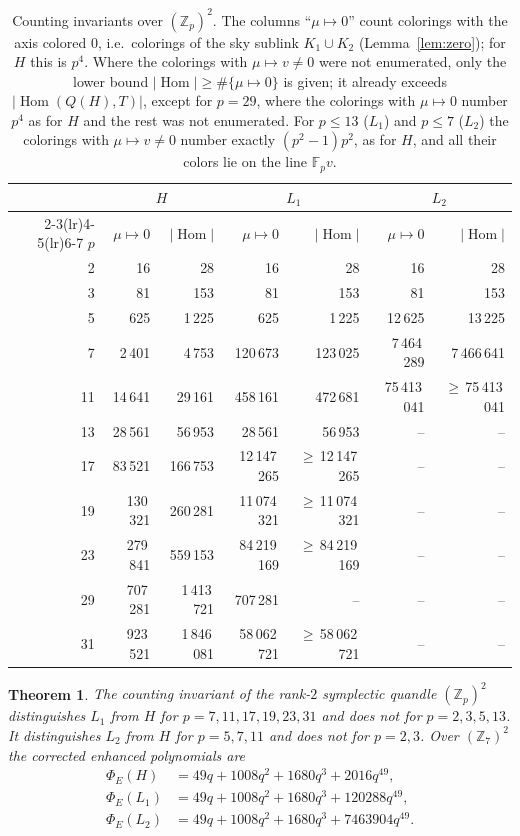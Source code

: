 \documentclass[11pt]{article}
\newtheorem{theorem}{Theorem}[section]
\theoremstyle{definition}
\newcommand{\Z}{\mathbb{Z}}
\newcommand{\F}{\mathbb{F}}
\newcommand{\Hom}{\operatorname{Hom}}
\newcommand{\PhiE}{\Phi_E}
\begin{document}
\begin{table}[h]
\centering\small
\begin{tabular}{@{}rrrrrrr@{}}
\toprule
 & \multicolumn{2}{c}{$H$} & \multicolumn{2}{c}{$L_1$} & \multicolumn{2}{c}{$L_2$}\\
\cmidrule(lr){2-3}\cmidrule(lr){4-5}\cmidrule(lr){6-7}
$p$ & $\mu\mapsto0$ & $|\Hom|$ & $\mu\mapsto0$ & $|\Hom|$ & $\mu\mapsto0$ & $|\Hom|$\\
\midrule
2 & 16 & 28 & 16 & 28 & 16 & 28 \\
3 & 81 & 153 & 81 & 153 & 81 & 153 \\
5 & 625 & 1\,225 & 625 & 1\,225 & 12\,625 & 13\,225 \\
7 & 2\,401 & 4\,753 & 120\,673 & 123\,025 & 7\,464\,289 & 7\,466\,641 \\
11 & 14\,641 & 29\,161 & 458\,161 & 472\,681 & 75\,413\,041 & $\ge$\,75\,413\,041 \\
13 & 28\,561 & 56\,953 & 28\,561 & 56\,953 & -- & -- \\
17 & 83\,521 & 166\,753 & 12\,147\,265 & $\ge$\,12\,147\,265 & -- & -- \\
19 & 130\,321 & 260\,281 & 11\,074\,321 & $\ge$\,11\,074\,321 & -- & -- \\
23 & 279\,841 & 559\,153 & 84\,219\,169 & $\ge$\,84\,219\,169 & -- & -- \\
29 & 707\,281 & 1\,413\,721 & 707\,281 & -- & -- & -- \\
31 & 923\,521 & 1\,846\,081 & 58\,062\,721 & $\ge$\,58\,062\,721 & -- & -- \\
\bottomrule
\end{tabular}
\caption{Counting invariants over $(\Z_p)^2$. The columns ``$\mu\mapsto0$'' count colorings with the axis
colored $0$, i.e.\ colorings of the sky sublink $K_1\cup K_2$ (Lemma~\ref{lem:zero}); for $H$ this is
$p^4$. Where the colorings with $\mu\mapsto v\ne0$ were not enumerated, only the lower bound
$|\Hom|\ge\#\{\mu\mapsto0\}$ is given; it already exceeds $|\Hom(Q(H),T)|$, except for $p=29$, where
the colorings with $\mu\mapsto0$ number $p^4$ as for $H$ and the rest was not enumerated. For $p\le13$ ($L_1$) and $p\le7$
($L_2$) the colorings with $\mu\mapsto v\ne0$ number exactly $(p^2-1)p^2$, as for $H$, and all their colors
lie on the line $\F_pv$.}
\label{tab:primes}
\end{table}

\begin{theorem}\label{thm:Zp}
The counting invariant of the rank-$2$ symplectic quandle $(\Z_p)^2$ distinguishes $L_1$ from $H$ for
$p=7,11,17,19,23,31$ and does not for $p=2,3,5,13$. It distinguishes $L_2$ from $H$ for $p=5,7,11$ and does
not for $p=2,3$. Over $(\Z_7)^2$ the corrected enhanced polynomials are
\begin{align*}
\PhiE(H)&=49q+1008q^2+1680q^3+2016q^{49},\\
\PhiE(L_1)&=49q+1008q^2+1680q^3+120288q^{49},\\
\PhiE(L_2)&=49q+1008q^2+1680q^3+7463904q^{49}.
\end{align*}
\end{theorem}
\end{document}
